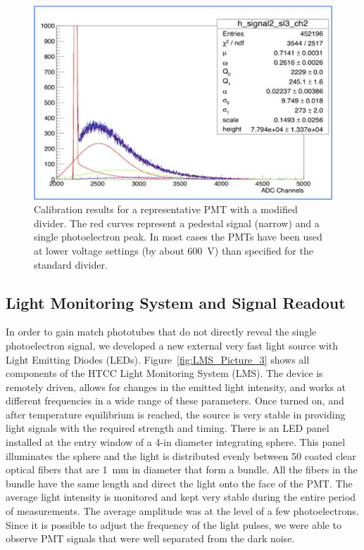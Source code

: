 \begin{figure}[!ht]
    \centering
    \includegraphics[width=1.0\linewidth,trim={0.0cm 0.0cm 0.0cm 0.0cm},clip]{images/POPOV_4.jpg}
    \caption{Calibration results for a representative PMT with a modified divider. The red curves represent a pedestal
      signal (narrow) and a single photoelectron peak. In most cases the PMTs have been used at lower voltage settings
      (by about 600~V) than specified for the standard divider.}
    \label{fig:POPOV_4}
\end{figure}

\subsection{Light Monitoring System and Signal Readout}

In order to gain match phototubes that do not directly reveal the single photoelectron signal, we developed a new
external very fast light source with Light Emitting Diodes (LEDs). Figure~\ref{fig:LMS_Picture_3} shows all
components of the HTCC Light Monitoring System (LMS). The device is remotely driven, allows for changes in the
emitted light intensity, and works at different frequencies in a wide range of these parameters. Once turned on,
and after temperature equilibrium is reached, the source is very stable in providing light signals with the required
strength and timing. There is an LED panel installed at the entry window of a 4-in diameter integrating sphere. This
panel illuminates the sphere and the light is distributed evenly between 50 coated clear optical fibers that are 1~mm
in diameter that form a bundle. All the fibers in the bundle have the same length and direct the light onto the
face of the PMT. The average light intensity is monitored and kept very stable during the entire period of
measurements. The average amplitude was at the level of a few photoelectrons. Since it is possible to adjust the
frequency of the light pulses, we were able to observe PMT signals that were well separated from the dark noise.
 

